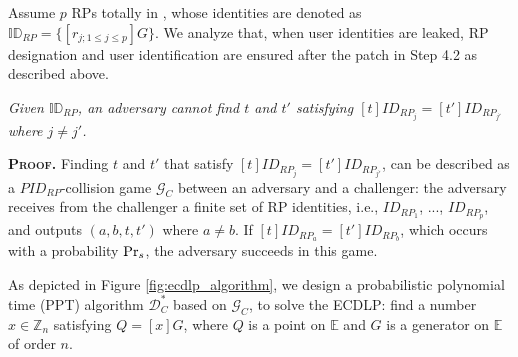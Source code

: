Assume $p$ RPs totally in \usso,
    whose identities are denoted as $\mathbb{ID}_{RP} = \{[r_{j; 1 \leq j \leq p}]G\}$.
We analyze that, when user identities are leaked,
    RP designation and user identification are ensured after the patch in Step 4.2 as described above.

\vspace{-1mm}
\begin{lemma}
\emph{Given $\mathbb{ID}_{RP}$, an adversary cannot find $t$ and $t'$ satisfying $[t]ID_{RP_j} = [t']ID_{RP_{j'}}$ where $j \neq j'$.}\label{thm-rp-collision}
\end{lemma}
\vspace{-1mm}

\noindent\textbf{\textsc{Proof.}} 
Finding $t$ and $t'$ that satisfy $[t]ID_{RP_j} = [t']ID_{RP_{j'}}$, can be described as a $PID_{RP}$-collision game $\mathcal{G}_C$ between an adversary and a challenger: the adversary receives from the challenger a finite set of RP identities, i.e., $ID_{RP_1}$, ..., $ID_{RP_p}$, and outputs $(a, b, t, t')$ where $a \neq b$. If $[t]ID_{RP_a}=[t']ID_{RP_b}$, which occurs with a probability ${\rm Pr}_s$, the adversary succeeds in this game.

As depicted in Figure \ref{fig:ecdlp_algorithm}, we design a probabilistic polynomial time (PPT) algorithm $\mathcal{D}^*_C$ based on $\mathcal{G}_C$, to solve the ECDLP: find a number $x \in \mathbb{Z}_n$ satisfying $Q = [x]G$, where $Q$ is a point on $\mathbb{E}$ and $G$ is a generator on $\mathbb{E}$ of order $n$.

